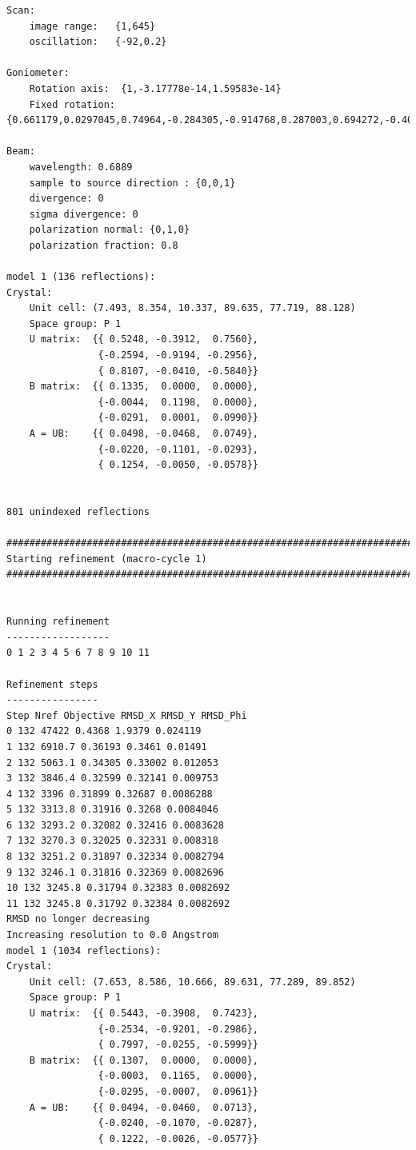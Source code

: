 \documentclass[a4paper, 11pt]{article}
\begin{document}
{\begin{verbatim}
Scan:
    image range:   {1,645}
    oscillation:   {-92,0.2}

Goniometer:
    Rotation axis:  {1,-3.17778e-14,1.59583e-14}
    Fixed rotation: {0.661179,0.0297045,0.74964,-0.284305,-0.914768,0.287003,0.694272,-0.402887,-0.59638}

Beam:
    wavelength: 0.6889
    sample to source direction : {0,0,1}
    divergence: 0
    sigma divergence: 0
    polarization normal: {0,1,0}
    polarization fraction: 0.8

model 1 (136 reflections):
Crystal:
    Unit cell: (7.493, 8.354, 10.337, 89.635, 77.719, 88.128)
    Space group: P 1
    U matrix:  {{ 0.5248, -0.3912,  0.7560},
                {-0.2594, -0.9194, -0.2956},
                { 0.8107, -0.0410, -0.5840}}
    B matrix:  {{ 0.1335,  0.0000,  0.0000},
                {-0.0044,  0.1198,  0.0000},
                {-0.0291,  0.0001,  0.0990}}
    A = UB:    {{ 0.0498, -0.0468,  0.0749},
                {-0.0220, -0.1101, -0.0293},
                { 0.1254, -0.0050, -0.0578}}


801 unindexed reflections

################################################################################
Starting refinement (macro-cycle 1)
################################################################################


Running refinement
------------------
0 1 2 3 4 5 6 7 8 9 10 11

Refinement steps
----------------
Step Nref Objective RMSD_X RMSD_Y RMSD_Phi
0 132 47422 0.4368 1.9379 0.024119 
1 132 6910.7 0.36193 0.3461 0.01491 
2 132 5063.1 0.34305 0.33002 0.012053 
3 132 3846.4 0.32599 0.32141 0.009753 
4 132 3396 0.31899 0.32687 0.0086288 
5 132 3313.8 0.31916 0.3268 0.0084046 
6 132 3293.2 0.32082 0.32416 0.0083628 
7 132 3270.3 0.32025 0.32331 0.008318 
8 132 3251.2 0.31897 0.32334 0.0082794 
9 132 3246.1 0.31816 0.32369 0.0082696 
10 132 3245.8 0.31794 0.32383 0.0082692 
11 132 3245.8 0.31792 0.32384 0.0082692 
RMSD no longer decreasing
Increasing resolution to 0.0 Angstrom
model 1 (1034 reflections):
Crystal:
    Unit cell: (7.653, 8.586, 10.666, 89.631, 77.289, 89.852)
    Space group: P 1
    U matrix:  {{ 0.5443, -0.3908,  0.7423},
                {-0.2534, -0.9201, -0.2986},
                { 0.7997, -0.0255, -0.5999}}
    B matrix:  {{ 0.1307,  0.0000,  0.0000},
                {-0.0003,  0.1165,  0.0000},
                {-0.0295, -0.0007,  0.0961}}
    A = UB:    {{ 0.0494, -0.0460,  0.0713},
                {-0.0240, -0.1070, -0.0287},
                { 0.1222, -0.0026, -0.0577}}



\end{verbatim}}
\end{document}
